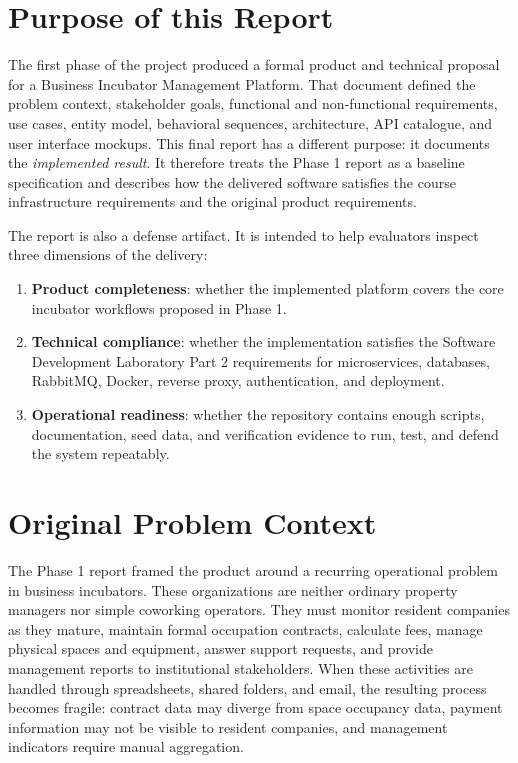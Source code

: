 \documentclass[12pt,a4paper]{report}
\begin{document}
\section{Purpose of this Report}
\label{sec:purpose}

The first phase of the project produced a formal product and technical proposal
for a Business Incubator Management Platform. That document defined the problem
context, stakeholder goals, functional and non-functional requirements, use
cases, entity model, behavioral sequences, architecture, API catalogue, and user
interface mockups. This final report has a different purpose: it documents the
\textit{implemented result}. It therefore treats the Phase 1 report as a
baseline specification and describes how the delivered software satisfies the
course infrastructure requirements and the original product requirements.

The report is also a defense artifact. It is intended to help evaluators inspect
three dimensions of the delivery:
\begin{enumerate}
  \item \textbf{Product completeness}: whether the implemented platform covers
  the core incubator workflows proposed in Phase 1.
  \item \textbf{Technical compliance}: whether the implementation satisfies the
  Software Development Laboratory Part 2 requirements for microservices,
  databases, RabbitMQ, Docker, reverse proxy, authentication, and deployment.
  \item \textbf{Operational readiness}: whether the repository contains enough
  scripts, documentation, seed data, and verification evidence to run, test, and
  defend the system repeatably.
\end{enumerate}

\section{Original Problem Context}
\label{sec:original-problem}

The Phase 1 report framed the product around a recurring operational problem in
business incubators. These organizations are neither ordinary property managers
nor simple coworking operators. They must monitor resident companies as they
mature, maintain formal occupation contracts, calculate fees, manage physical
spaces and equipment, answer support requests, and provide management reports to
institutional stakeholders. When these activities are handled through
spreadsheets, shared folders, and email, the resulting process becomes fragile:
contract data may diverge from space occupancy data, payment information may not
be visible to resident companies, and management indicators require manual
aggregation.
\end{document}
